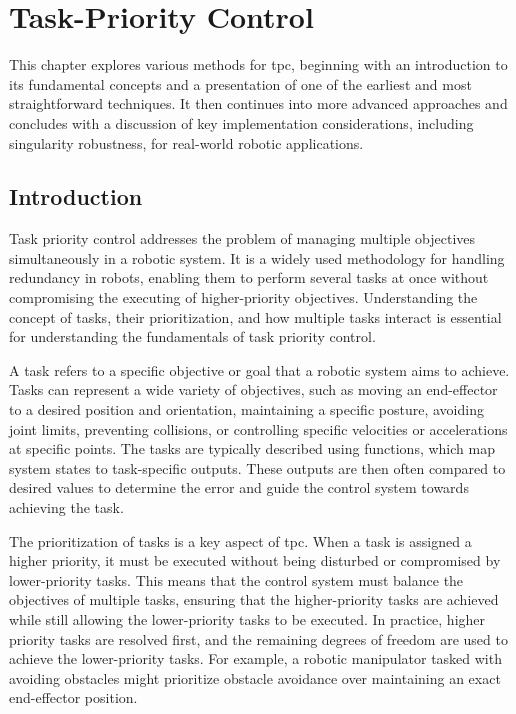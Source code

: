 \chapter{Task-Priority Control}
\label{ch:tpc}
\label{chap:tpc}

This chapter explores various methods for \gls{tpc}, beginning with
an introduction to its fundamental concepts and a presentation of one of the
earliest and most straightforward techniques. It then continues into more advanced
approaches and concludes with a discussion of key implementation considerations,
including singularity robustness, for real-world robotic applications.

\section{Introduction}
\label{sec:tpc_intro}

Task priority control addresses the problem of managing multiple objectives simultaneously in a robotic system. It is a widely used methodology for handling redundancy in robots, enabling them to perform several tasks at once without compromising the executing of higher-priority objectives. Understanding the concept of tasks, their prioritization, and how multiple tasks interact is essential for understanding the fundamentals of task priority control.

A task refers to a specific objective or goal that a robotic system aims to achieve. Tasks can represent a wide variety of objectives, such as moving an end-effector to a desired position and orientation, maintaining a specific posture, avoiding joint limits, preventing collisions, or controlling specific velocities or accelerations at specific points. The tasks are typically described using functions, which map system states to task-specific outputs. These outputs are then often compared to desired values to determine the error and guide the control system towards achieving the task.

The prioritization of tasks is a key aspect of \gls{tpc}. When a task is assigned a higher priority, it must be executed without being disturbed or compromised by lower-priority tasks. This means that the control system must balance the objectives of multiple tasks, ensuring that the higher-priority tasks are achieved while still allowing the lower-priority tasks to be executed. In practice, higher priority tasks are resolved first, and the remaining degrees of freedom are used to achieve the lower-priority tasks. For example, a robotic manipulator tasked with avoiding obstacles might prioritize obstacle avoidance over maintaining an exact end-effector position.

